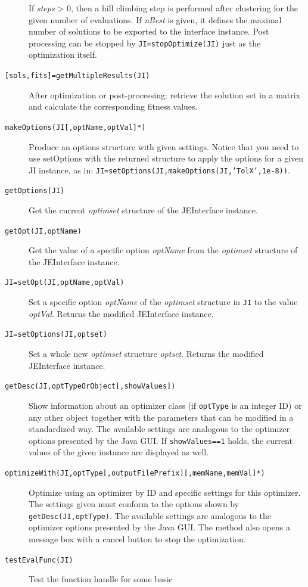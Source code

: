 \begin{description}
If \emph{steps} > 0, then a hill climbing step is performed after
clustering for the given number of evaluations. If \emph{nBest} is
given, it defines the maximal number of solutions to be exported to
the interface instance. Post processing can be stopped by \texttt{JI=stopOptimize(JI)}
just as the optimization itself.
\item [{\texttt{{[}sols,fits{]}=getMultipleResults(JI)}}] After optimization
or post-processing: retrieve the solution set in a matrix and calculate
the corresponding fitness values.
\item [{\texttt{makeOptions(JI{[},optName,optVal{]}{*})}}] Produce an options
structure with given settings. Notice that you need to use setOptions
with the returned structure to apply the options for a given JI instance,
as in: \texttt{JI=setOptions(JI,makeOptions(JI,'TolX',1e-8))}. 
\item [{\texttt{getOptions(JI)}}] Get the current \emph{optimset} structure
of the JEInterface instance.
\item [{\texttt{getOpt(JI,optName)}}] Get the value of a specific option
\emph{optName} from the \emph{optimset} structure of the JEInterface
instance.
\item [{\texttt{JI=setOpt(JI,optName,optVal)}}] Set a specific option \emph{optName}
of the \emph{optimset} structure in \texttt{JI} to the value \emph{optVal}.
Returns the modified JEInterface instance.
\item [{\texttt{JI=setOptions(JI,optset)}}] Set a whole new \emph{optimset}
structure \emph{optset}. Returns the modified JEInterface instance.
\item [{\texttt{getDesc(JI,optTypeOrObject{[},showValues{]})}}] Show information
about an optimizer class (if \texttt{optType} is an integer ID) or
any other object together with the parameters that can be modified
in a standardized way. The available settings are analogous to the
optimizer options presented by the Java GUI. If \texttt{showValues==1}
holds, the current values of the given instance are displayed as well.
\item [{\texttt{optimizeWith(JI,optType{[},outputFilePrefix{]}{[},memName,memVal{]}{*})}}] Optimize
using an optimizer by ID and specific settings for this optimizer.
The settings given must conform to the options shown by \texttt{getDesc(JI,optType)}.
The available settings are analogous to the optimizer options presented
by the Java GUI. The method also opens a message box with a cancel
button to stop the optimization.
\item [{\texttt{testEvalFunc(JI)}}] Test the function handle for some basic

\end{description}
